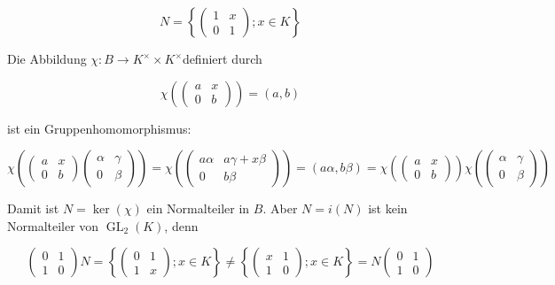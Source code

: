 \documentclass[10pt, letterpaper]{article}
\begin{document}
$$
N=\left\{\left(\begin{array}{cc}
1 & x \\
0 & 1
\end{array}\right) ; x \in K\right\}
$$

Die Abbildung $\chi: B \rightarrow K^{\times} \times K^{\times}$definiert durch

$$
\chi\left(\left(\begin{array}{ll}
a & x \\
0 & b
\end{array}\right)\right)=(a, b)
$$

ist ein Gruppenhomomorphismus:

$$
\chi\left(\left(\begin{array}{ll}
a & x \\
0 & b
\end{array}\right)\left(\begin{array}{cc}
\alpha & \gamma \\
0 & \beta
\end{array}\right)\right)=\chi\left(\left(\begin{array}{cc}
a \alpha & a \gamma+x \beta \\
0 & b \beta
\end{array}\right)\right)=(a \alpha, b \beta)=\chi\left(\left(\begin{array}{cc}
a & x \\
0 & b
\end{array}\right)\right) \chi\left(\left(\begin{array}{cc}
\alpha & \gamma \\
0 & \beta
\end{array}\right)\right)
$$

Damit ist $N=\operatorname{ker}(\chi)$ ein Normalteiler in $B$. Aber $N=i(N)$ ist kein Normalteiler von $\operatorname{GL}_{2}(K)$, denn

$$
\left(\begin{array}{ll}
0 & 1 \\
1 & 0
\end{array}\right) N=\left\{\left(\begin{array}{ll}
0 & 1 \\
1 & x
\end{array}\right) ; x \in K\right\} \neq\left\{\left(\begin{array}{ll}
x & 1 \\
1 & 0
\end{array}\right) ; x \in K\right\}=N\left(\begin{array}{ll}
0 & 1 \\
1 & 0
\end{array}\right)
$$
\end{document}
